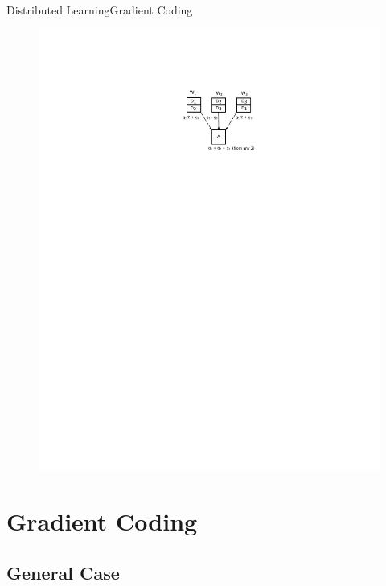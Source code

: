 \documentclass{beamer}
\begin{document}
\begin{frame}{Distributed Learning}{Gradient Coding}

\begin{figure}
    \centering
    \includegraphics[height=.7\textheight]{res/gradient coding.pdf}
\end{figure}

\end{frame}

\section{Gradient Coding}

\subsection{General Case}
\end{document}
